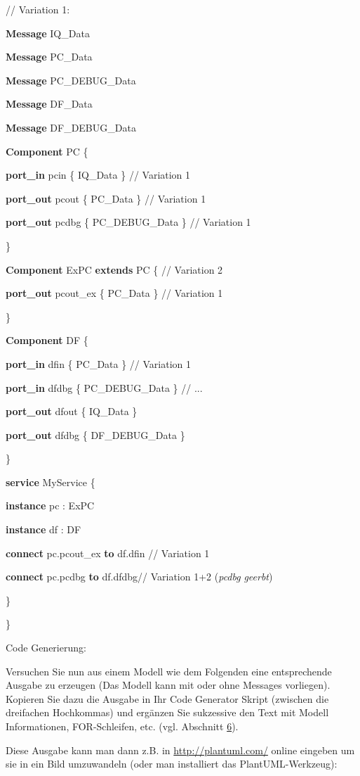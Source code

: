 \documentclass[]{article}
\begin{document}
// Variation 1:

\textbf{Message} IQ\_Data

\textbf{Message} PC\_Data

\textbf{Message} PC\_DEBUG\_Data

\textbf{Message} DF\_Data

\textbf{Message} DF\_DEBUG\_Data

\textbf{Component} PC \{

\textbf{port\_in} pcin \{ IQ\_Data \} // Variation 1

\textbf{port\_out} pcout \{ PC\_Data \} // Variation 1

\textbf{port\_out} pcdbg \{ PC\_DEBUG\_Data \} // Variation 1

\}

\textbf{Component} ExPC \textbf{extends} PC \{ // Variation 2

\textbf{port\_out} pcout\_ex \{ PC\_Data \} // Variation 1

\}

\textbf{Component} DF \{

\textbf{port\_in} dfin \{ PC\_Data \} // Variation 1

\textbf{port\_in} dfdbg \{ PC\_DEBUG\_Data \} // ...

\textbf{port\_out} dfout \{ IQ\_Data \}

\textbf{port\_out} dfdbg \{ DF\_DEBUG\_Data \}

\}

\textbf{service} MyService \{

\textbf{instance} pc : ExPC

\textbf{instance} df : DF

\textbf{connect} pc.pcout\_ex \textbf{to} df.dfin // Variation 1

\textbf{connect} pc.pcdbg \textbf{to} df.dfdbg// Variation 1+2
(\emph{pcdbg} \emph{geerbt})

\}

\}

Code Generierung:

Versuchen Sie nun aus einem Modell wie dem Folgenden eine entsprechende
Ausgabe zu erzeugen (Das Modell kann mit oder ohne Messages vorliegen).
Kopieren Sie dazu die Ausgabe in Ihr Code Generator Skript (zwischen die
dreifachen Hochkommas) und ergänzen Sie sukzessive den Text mit Modell
Informationen, FOR-Schleifen, etc. (vgl. Abschnitt
\protect\hyperlink{anchor-33}{6}).

Diese Ausgabe kann man dann z.B. in \url{http://plantuml.com/} online
eingeben um sie in ein Bild umzuwandeln (oder man installiert das
PlantUML-Werkzeug):
\end{document}

